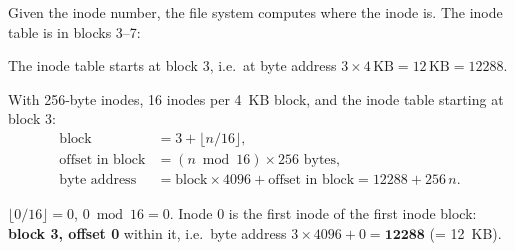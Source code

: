 \documentclass[11pt,a4paper]{article}
\begin{document}
Given the inode number, the file system computes where the inode is. The
inode table is in blocks 3--7:

\begin{center}

{\small The inode table starts at block 3, i.e.\ at byte address
\(3\times4\,\text{KB} = 12\,\text{KB} = 12288\).}
\end{center}

\begin{keybox}
With 256-byte inodes, 16 inodes per 4~KB block, and the inode table starting
at block 3:
\begin{align*}
  \text{block}            &= 3 + \lfloor n / 16 \rfloor, \\
  \text{offset in block}  &= (n \bmod 16)\times 256 \text{ bytes}, \\
  \text{byte address}     &= \text{block}\times4096 + \text{offset in block}
                           = 12288 + 256\,n.
\end{align*}

\end{keybox}

\begin{quizbox}
\(\lfloor 0/16\rfloor = 0\), \(0 \bmod 16 = 0\). Inode 0 is the first inode
of the first inode block: \textbf{block 3, offset 0} within it, i.e.\ byte
address \(3\times4096 + 0 = \mathbf{12288}\) (= 12~KB).
\end{quizbox}
\end{document}
